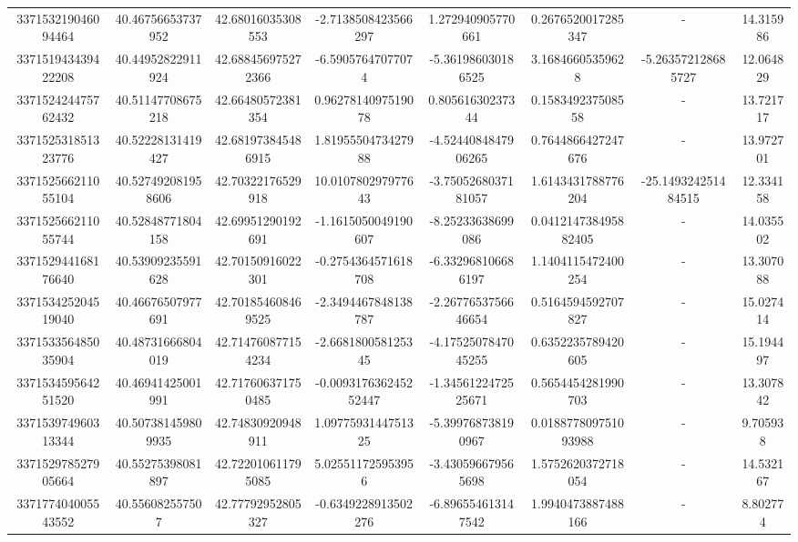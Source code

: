 \documentclass{article}
\begin{document}
\begin{landscape}
\begin{longtable}[c]{S[table-format=18.0]S[table-format=2.15]S[table-format=2.15]S[table-format=-2.17]S[table-format=-2.16]S[table-format=-2.16]S[table-format=-3.16]S[table-format=2.7]}
337153219046094464 & 40.46756653737952  & 42.68016035308553  & -2.7138508423566297   & 1.272940905770661    & 0.2676520017285347   & {-}                  & 14.315986  \\
337151943439422208 & 40.44952822911924  & 42.688456975272366 & -6.59057647077074     & -5.361986030186525   & 3.16846605359628     & -5.263572128685727  & 12.064829  \\
337152424475762432 & 40.51147708675218  & 42.66480572381354  & 0.9627814097519078    & 0.80561630237344     & 0.158349237508558    & {-}                  & 13.721717  \\
337152531851323776 & 40.52228131419427  & 42.681973845486915 & 1.8195550473427988    & -4.5244084847906265  & 0.7644866427247676   & {-}                  & 13.972701  \\
337152566211055104 & 40.527492081958606 & 42.70322176529918  & 10.010780297977643    & -3.7505268037181057  & 1.6143431788776204   & -25.149324251484515 & 12.334158  \\
337152566211055744 & 40.52848771804158  & 42.69951290192691  & -1.1615050049190607   & -8.25233638699086    & 0.041214738495882405 & {-}                  & 14.035502  \\
337152944168176640 & 40.53909235591628  & 42.70150916022301  & -0.2754364571618708   & -6.332968106686197   & 1.1404115472400254   & {-}                  & 13.307088  \\
337153425204519040 & 40.46676507977691  & 42.701854608469525 & -2.3494467848138787   & -2.2677653756646654  & 0.5164594592707827   & {-}                  & 15.027414  \\
337153356485035904 & 40.48731666804019  & 42.714760877154234 & -2.668180058125345    & -4.1752507847045255  & 0.6352235789420605   & {-}                  & 15.194497  \\
337153459564251520 & 40.46941425001991  & 42.717606371750485 & -0.009317636245252447 & -1.3456122472525671  & 0.5654454281990703   & {-}                  & 13.307842  \\
337153974960313344 & 40.507381459809935 & 42.74830920948911  & 1.0977593144751325    & -5.399768738190967   & 0.018877809751093988 & {-}                  & 9.705938   \\
337152978527905664 & 40.55275398081897  & 42.722010611795085 & 5.025511725953956     & -3.430596679565698   & 1.5752620372718054   & {-}                  & 14.532167  \\
337177404005543552 & 40.556082557507    & 42.77792952805327  & -0.6349228913502276   & -6.896554613147542   & 1.9940473887488166   & {-}                  & 8.802774   \\

\end{longtable}
\end{landscape}
\end{document}
